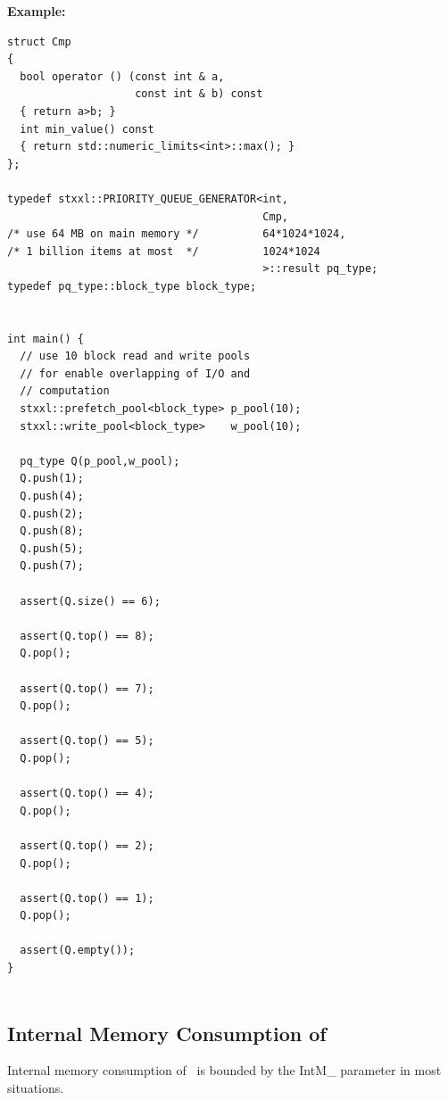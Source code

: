 \documentclass[twoside]{book}
\begin{document}
\begin{enumerate}
\end{enumerate}

{\bf Example:}
\begin{lstlisting}
struct Cmp
{
  bool operator () (const int & a, 
                    const int & b) const 
  { return a>b; }
  int min_value() const  
  { return std::numeric_limits<int>::max(); }
};

typedef stxxl::PRIORITY_QUEUE_GENERATOR<int,
                                        Cmp,
/* use 64 MB on main memory */          64*1024*1024,
/* 1 billion items at most  */          1024*1024
                                        >::result pq_type;
typedef pq_type::block_type block_type;


int main() {
  // use 10 block read and write pools 
  // for enable overlapping of I/O and
  // computation
  stxxl::prefetch_pool<block_type> p_pool(10);
  stxxl::write_pool<block_type>    w_pool(10);

  pq_type Q(p_pool,w_pool);
  Q.push(1);
  Q.push(4);
  Q.push(2);
  Q.push(8);
  Q.push(5);
  Q.push(7);
  
  assert(Q.size() == 6);

  assert(Q.top() == 8);
  Q.pop();

  assert(Q.top() == 7);
  Q.pop();

  assert(Q.top() == 5);
  Q.pop();

  assert(Q.top() == 4);
  Q.pop();

  assert(Q.top() == 2);
  Q.pop();

  assert(Q.top() == 1);
  Q.pop();

  assert(Q.empty());
}


\end{lstlisting}

\subsection{Internal Memory Consumption of \xpqueue}
Internal memory consumption of \xpqueue\ is bounded by the IntM\_
parameter in most situations.

\newcommand{\xsort}{{\texttt{stxxl::sort}}}
\newcommand{\xksort}{{\texttt{stxxl::ksort}}}
\newcommand{\stdsort}{{\texttt{std::sort}}}
\end{document}

